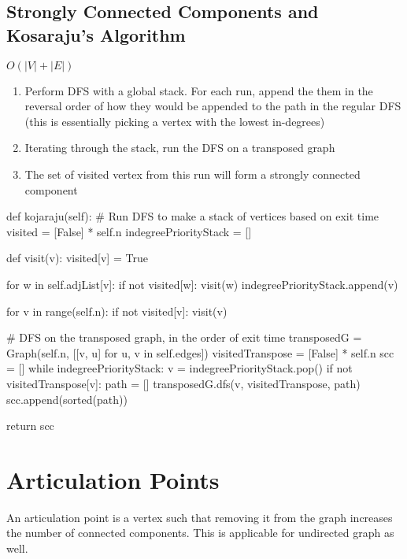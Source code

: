 \subsection{Strongly Connected Components and Kosaraju's Algorithm}

$O(|V| + |E|)$

\begin{enumerate}
  \item Perform DFS with a global stack. For each run, append the them in the reversal order of how they would be appended to the path in the regular DFS (this is essentially picking a vertex with the lowest in-degrees)
  \item Iterating through the stack, run the DFS on a transposed graph
  \item The set of visited vertex from this run will form a strongly connected component
\end{enumerate}

\begin{python}
    def kojaraju(self):
        # Run DFS to make a stack of vertices based on exit time
        visited = [False] * self.n
        indegreePriorityStack = []

        def visit(v):
            visited[v] = True

            for w in self.adjList[v]:
                if not visited[w]:
                    visit(w)
            indegreePriorityStack.append(v)

        for v in range(self.n):
            if not visited[v]:
                visit(v)

        # DFS on the transposed graph, in the order of exit time
        transposedG = Graph(self.n, [[v, u] for u, v in self.edges])
        visitedTranspose = [False] * self.n
        scc = []
        while indegreePriorityStack:
            v = indegreePriorityStack.pop()
            if not visitedTranspose[v]:
                path = []
                transposedG.dfs(v, visitedTranspose, path)
                scc.append(sorted(path))

        return scc
\end{python}

\section{Articulation Points}

An articulation point is a vertex such that removing it from the graph increases the number of connected components.
This is applicable for undirected graph as well.

